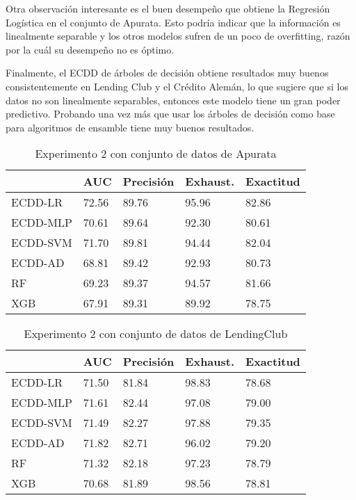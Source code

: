 Otra observación interesante es el buen desempeño que obtiene la Regresión Logística en el conjunto de Apurata. Esto podría indicar que la información es linealmente separable y los otros modelos sufren de un poco de overfitting, razón por la cuál su desempeño no es óptimo.

Finalmente, el \ac{ECDD} de árboles de decisión obtiene resultados muy buenos consistentemente en Lending Club y el Crédito Alemán, lo que sugiere que si los datos no son linealmente separables, entonces este modelo tiene un gran poder predictivo. Probando una vez más que usar los árboles de decisión como base para algoritmos de ensamble tiene muy buenos resultados.

\begin{table}[]
\centering
\caption{Experimento 2 con conjunto de datos de Apurata}
\label{tab:apurata-proc2}
\begin{tabularx}{0.75\textwidth}{|l|Y Y Y Y|}
				\hline
				& AUC		& Precisión	& Exhaust.		& Exactitud	\\
				\hline
ECDD-LR			& 72.56		& 89.76		& 95.96			& 82.86		\\	%
ECDD-MLP	 	& 70.61		& 89.64		& 92.30			& 80.61		\\
ECDD-SVM	 	& 71.70		& 89.81		& 94.44			& 82.04		\\
ECDD-AD			& 68.81		& 89.42		& 92.93			& 80.73		\\
				\hline
RF		 		& 69.23		& 89.37		& 94.57			& 81.66		\\	%
XGB				& 67.91		& 89.31		& 89.92			& 78.75		\\
				\hline
\end{tabularx}
\end{table}


\begin{table}[]
\centering
\caption{Experimento 2 con conjunto de datos de LendingClub}
\label{tab:lc-proc2}
\begin{tabularx}{0.75\textwidth}{|l|Y Y Y Y|}
				\hline
				& AUC		& Precisión	& Exhaust.		& Exactitud	\\
				\hline
ECDD-LR			& 71.50		& 81.84		& 98.83			& 78.68		\\
ECDD-MLP		& 71.61		& 82.44		& 97.08			& 79.00		\\
ECDD-SVM		& 71.49		& 82.27		& 97.88			& 79.35		\\
ECDD-AD			& 71.82		& 82.71		& 96.02			& 79.20		\\
				\hline
RF				& 71.32		& 82.18		& 97.23			& 78.79		\\
XGB				& 70.68		& 81.89		& 98.56			& 78.81		\\
				\hline
\end{tabularx}
\end{table}


